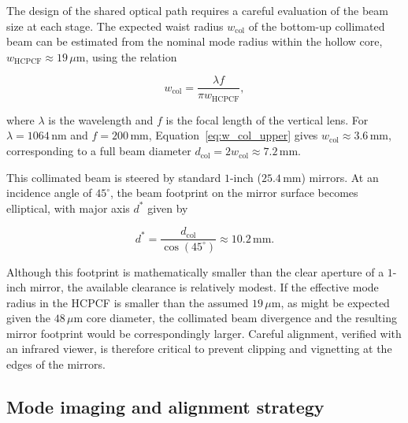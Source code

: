 The design of the shared optical path requires a careful evaluation of the beam size at each stage. The expected waist radius $w_{\mathrm{col}}$ of the bottom-up collimated beam can be estimated from the nominal mode radius within the hollow core, $w_{\mathrm{HCPCF}} \approx 19\,\mu\mathrm{m}$, using the relation

\begin{equation}
    w_{\mathrm{col}} = \frac{\lambda f}{\pi w_{\mathrm{HCPCF}}},
    \label{eq:w_col_upper}
\end{equation}

where $\lambda$ is the wavelength and $f$ is the focal length of the vertical lens. For $\lambda = 1064\,\mathrm{nm}$ and $f = 200\,\mathrm{mm}$, Equation~\eqref{eq:w_col_upper} gives $w_{\mathrm{col}} \approx 3.6\,\mathrm{mm}$, corresponding to a full beam diameter $d_{\mathrm{col}} = 2 w_{\mathrm{col}} \approx 7.2\,\mathrm{mm}$.

This collimated beam is steered by standard $1$-inch ($25.4\,\mathrm{mm}$) mirrors. At an incidence angle of $45^\circ$, the beam footprint on the mirror surface becomes elliptical, with major axis $d^*$ given by

\begin{equation}
    d^* = \frac{d_{\mathrm{col}}}{\cos(45^\circ)} \approx 10.2\,\mathrm{mm}.
    \label{eq:mirror_footprint_upper}
\end{equation}

Although this footprint is mathematically smaller than the clear aperture of a $1$-inch mirror, the available clearance is relatively modest. If the effective mode radius in the HCPCF is smaller than the assumed $19\,\mu\mathrm{m}$, as might be expected given the $48\,\mu\mathrm{m}$ core diameter, the collimated beam divergence and the resulting mirror footprint would be correspondingly larger. Careful alignment, verified with an infrared viewer, is therefore critical to prevent clipping and vignetting at the edges of the  mirrors.

\subsection{Mode imaging and alignment strategy}
\label{subsec:upper_imaging}

